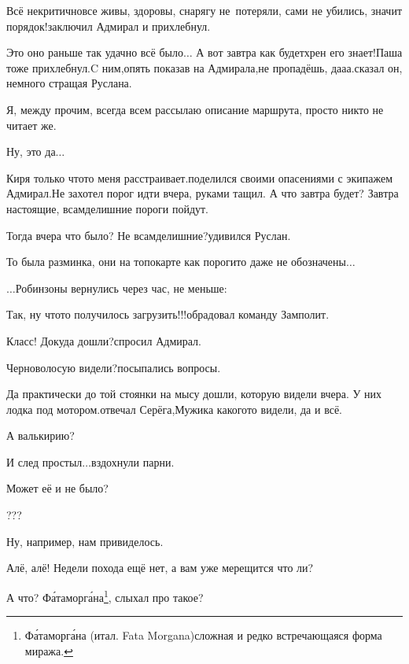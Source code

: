 \diagdash Всё некритично\mdash все живы, здоровы, снарягу не~потеряли, сами не убились, значит порядок!\mdash заключил Адмирал и прихлебнул.

\diagdash Это оно раньше так удачно всё было$\ldots$ А вот завтра как будет\mdash хрен его знает!\mdash Паша тоже прихлебнул.\mdash C ним,\mdash опять показав на Адмирала,\mdash не пропадёшь, да\sdash а\sdash а.\mdash сказал он, немного стращая Руслана.

\diagdash Я, между прочим, всегда всем рассылаю описание маршрута, просто никто не читает же.

\diagdash Ну, это да$\ldots$

\diagdash Киря только что\sdash то меня расстраивает.\mdash поделился своими опасениями с экипажем Адмирал.\mdash Не захотел порог идти вчера, руками тащил. А что завтра будет? Завтра настоящие, всамделишние пороги пойдут.

\diagdash Тогда вчера что было? Не всамделишние?\mdash удивился Руслан.

\diagdash То была разминка, они на топокарте как пороги\sdash то даже не обозначены$\ldots$

\vspace{0.5cm}
$\ldots$Робинзоны вернулись через час, не меньше:

\diagdash Так, ну что\sdash то получилось загрузить!!!\mdash обрадовал команду Замполит.

\diagdash Класс! Докуда дошли?\mdash спросил Адмирал.

\diagdash Черноволосую видели?\mdash посыпались вопросы.

\diagdash Да практически до той стоянки на мысу дошли, которую видели вчера. У них лодка под мотором.\mdash отвечал Серёга,\mdash Мужика какого\sdash то видели, да и всё.

\diagdash А валькирию?

\diagdash И след простыл$\ldots$\mdash вздохнули парни.

\diagdash Может её и не было?

\diagdash ???

\diagdash Ну, например, нам привиделось.

\diagdash Алё, алё! Недели похода ещё нет, а вам уже мерещится что ли?

\renewcommand*{\thefootnote}{\fnsymbol{footnote}}
\setcounter{footnote}{0}

\diagdash А что? Ф\'ата\sdash морг\'ана\footnote{Ф\'ата\sdash морг\'ана (итал. Fata Morgana)\mdash сложная и редко встречающаяся форма миража.}, слыхал про такое?

